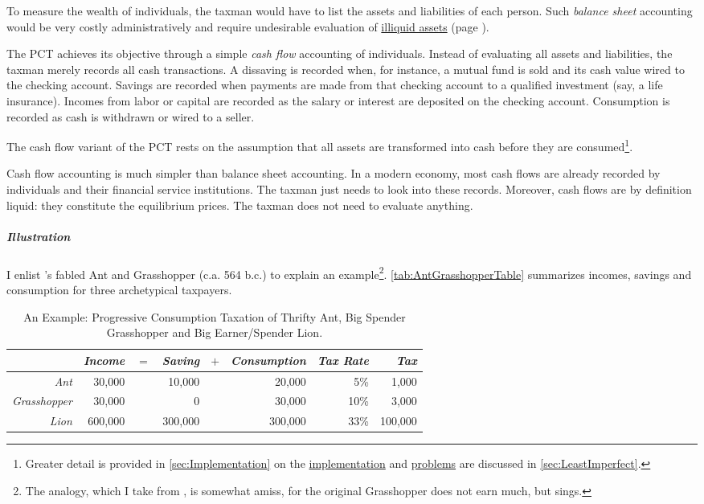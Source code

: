 To measure the wealth of individuals, the taxman would have to list the assets and liabilities of each person. Such \emph{balance sheet} accounting would be very costly administratively and require undesirable evaluation of \hyperref[des:NoIlliquidAssets]{illiquid assets} (page \pageref{des:NoIlliquidAssets}).

The PCT achieves its objective through a simple \emph{cash flow} accounting of individuals. Instead of evaluating all assets and liabilities, the taxman merely records all cash transactions. A dissaving is recorded when, for instance, a mutual fund is sold and its cash value wired to the checking account. Savings are recorded when payments are made from that checking account to a qualified investment (say, a life insurance). Incomes from labor or capital are recorded as the salary or interest are deposited on the checking account. Consumption is recorded as cash is withdrawn or wired to a seller.

The cash flow variant of the PCT rests on the assumption that all assets are transformed into cash before they are consumed\footnote{Greater detail is provided in \autoref{sec:Implementation} on the \hyperref[sec:Implementation]{implementation} and \hyperref[sec:LeastImperfect]{problems} are discussed in \autoref{sec:LeastImperfect}.}.

Cash flow accounting is much simpler than balance sheet accounting. In a modern economy, most cash flows are already recorded by individuals and their financial service institutions. The taxman just needs to look into these records. Moreover, cash flows are by definition liquid: they constitute the equilibrium prices. The taxman does not need to evaluate anything.

\subparagraph{Illustration} I enlist \citeauthor{Aesop}'s fabled Ant and Grasshopper (c.a. 564 b.c.) to explain an example\footnote{The analogy, which I take from \cite{McCaffery2005}, is somewhat amiss, for the original Grasshopper does not earn much, but sings.}. \autoref{tab:AntGrasshopperTable} summarizes incomes, savings and consumption for three archetypical taxpayers.

\begin{table}
	\caption[Example of a Postpaid Progressive Consumption Tax Account]{An Example: Progressive Consumption Taxation of Thrifty Ant, Big Spender Grasshopper and Big Earner/Spender Lion.}
	\label{tab:AntGrasshopperTable}
	\small
	\begin{center}
	\begin{tabular}{r r r r r r r r}
		\toprule
					 			&\emph{Income}	&$=$	&\emph{Saving}			&$+$	&\emph{Consumption}		&\emph{Tax Rate}		&\emph{Tax}\\
		\midrule
		\emph{Ant}				&30,000			&		&10,000					&		&20,000					&5\%					&1,000\\
		\emph{Grasshopper}	&30,000			&		&0							&		&30,000					&10\%					&3,000\\						\emph{Lion}			&600,000			&		&300,000					&		&300,000					&33\%					&100,000\\
		\bottomrule
	\end{tabular}
	\end{center}
\end{table}

